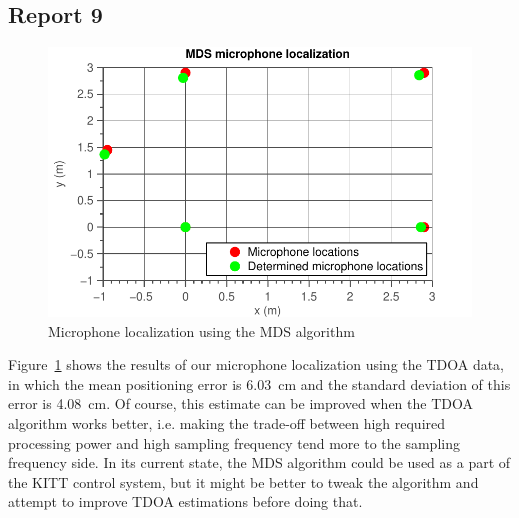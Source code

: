 \documentclass[11pt,titlepage]{report}
\begin{document}
\subsection{Report 9}
\label{subsec:ass-2-rep-9}
\begin{figure}[H]
	\begin{center}
		\includegraphics[width=.8\linewidth]{../../deliverable-7-resources/figures/ass-2/report-9/ass-2-report-9.pdf}
	\end{center}
	\caption{Microphone localization using the MDS algorithm}
	\label{fig:ass-2-rep-9}
\end{figure}
Figure~\ref{fig:ass-2-rep-9} shows the results of our microphone localization using the TDOA data, in which the mean positioning error is \SI{6.03}{\centi\meter} and the standard deviation of this error is \SI{4.08}{\centi\meter}. Of course, this estimate can be improved when the TDOA algorithm works better, i.e. making the trade-off between high required processing power and high sampling frequency tend more to the sampling frequency side. In its current state, the MDS algorithm could be used as a part of the KITT control system, but it might be better to tweak the algorithm and attempt to improve TDOA estimations before doing that.
\end{document}
